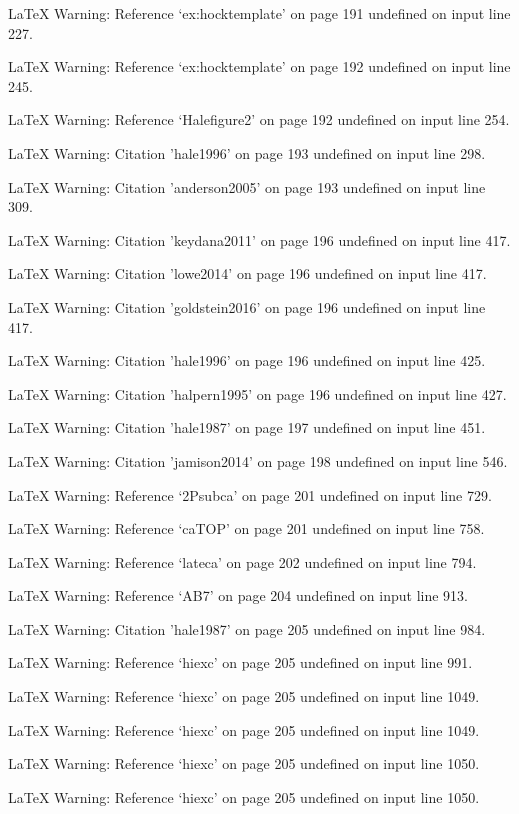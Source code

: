 LaTeX Warning: Reference `ex:hocktemplate' on page 191 undefined on input line 227.


LaTeX Warning: Reference `ex:hocktemplate' on page 192 undefined on input line 245.


LaTeX Warning: Reference `Halefigure2' on page 192 undefined on input line 254.


LaTeX Warning: Citation 'hale1996' on page 193 undefined on input line 298.


LaTeX Warning: Citation 'anderson2005' on page 193 undefined on input line 309.


LaTeX Warning: Citation 'keydana2011' on page 196 undefined on input line 417.


LaTeX Warning: Citation 'lowe2014' on page 196 undefined on input line 417.


LaTeX Warning: Citation 'goldstein2016' on page 196 undefined on input line 417.


LaTeX Warning: Citation 'hale1996' on page 196 undefined on input line 425.


LaTeX Warning: Citation 'halpern1995' on page 196 undefined on input line 427.


LaTeX Warning: Citation 'hale1987' on page 197 undefined on input line 451.


LaTeX Warning: Citation 'jamison2014' on page 198 undefined on input line 546.


LaTeX Warning: Reference `2Psubca' on page 201 undefined on input line 729.


LaTeX Warning: Reference `caTOP' on page 201 undefined on input line 758.


LaTeX Warning: Reference `lateca' on page 202 undefined on input line 794.


LaTeX Warning: Reference `AB7' on page 204 undefined on input line 913.


LaTeX Warning: Citation 'hale1987' on page 205 undefined on input line 984.


LaTeX Warning: Reference `hiexc' on page 205 undefined on input line 991.


LaTeX Warning: Reference `hiexc' on page 205 undefined on input line 1049.


LaTeX Warning: Reference `hiexc' on page 205 undefined on input line 1049.


LaTeX Warning: Reference `hiexc' on page 205 undefined on input line 1050.


LaTeX Warning: Reference `hiexc' on page 205 undefined on input line 1050.


